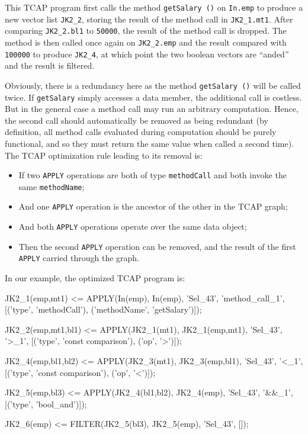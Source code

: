 \noindent
This TCAP program first calls the method \texttt{getSalary ()} on \texttt{In.emp} to produce a new vector list \texttt{JK2\_2}, storing the result
of the method call in \texttt{JK2\_1.mt1}.  After comparing \texttt{JK2\_2.bl1} to \texttt{50000}, the result of the method call is dropped.
The method is then called once again on \texttt{JK2\_2.emp} and the result compared with \texttt{100000} to produce \texttt{JK2\_4}, at which 
point the two boolean vectors are ``anded'' and the result is filtered.

Obviously, there is a redundancy here as the method \texttt{getSalary ()} will be called twice.
If \texttt{getSalary} simply accesses a data member, the additional call is costless.  But in the general case a method call may run an arbitrary
computation.  Hence, the second call should automatically be removed as being redundant 
(by definition, all method calls evaluated during computation should
be purely functional, and so they must return the same value when called a second time).
The TCAP optimization rule leading to its removal is:

\begin{itemize}
\vspace{-5 pt}
\item If two \texttt{APPLY} operations are both of type \texttt{methodCall} and both invoke the same \texttt{methodName};
\vspace{-5 pt}
\item And one \texttt{APPLY} operation is the ancestor of the other in the TCAP graph;
\vspace{-5 pt}
\item And both \texttt{APPLY} operations operate over the same data object;
\vspace{-5 pt}
\item Then the second \texttt{APPLY} operation can be removed, and the result of the first \texttt{APPLY} carried through the graph.
\end{itemize}

\noindent
In our example, the
optimized
TCAP program is:

\begin{codesmall}
JK2_1(emp,mt1) <= APPLY(In(emp), In(emp), 'Sel_43', 'method_call_1',
   [('type', 'methodCall'), ('methodName', 'getSalary')]);

JK2_2(emp,mt1,bl1) <= APPLY(JK2_1(mt1), JK2_1(emp,mt1), 'Sel_43', '>_1', 
  [('type', 'const comparison'), ('op', '>')]);

JK2_4(emp,bl1,bl2) <= APPLY(JK2_3(mt1), JK2_3(emp,bl1), 'Sel_43', '<_1', 
  [('type', 'const comparison'), ('op', '<')]);

JK2_5(emp,bl3) <= APPLY(JK2_4(bl1,bl2), JK2_4(emp), 'Sel_43', '&&_1', 
  [('type', 'bool_and')]);

JK2_6(emp) <= FILTER(JK2_5(bl3), JK2_5(emp), 'Sel_43', []);
  
\end{codesmall}

